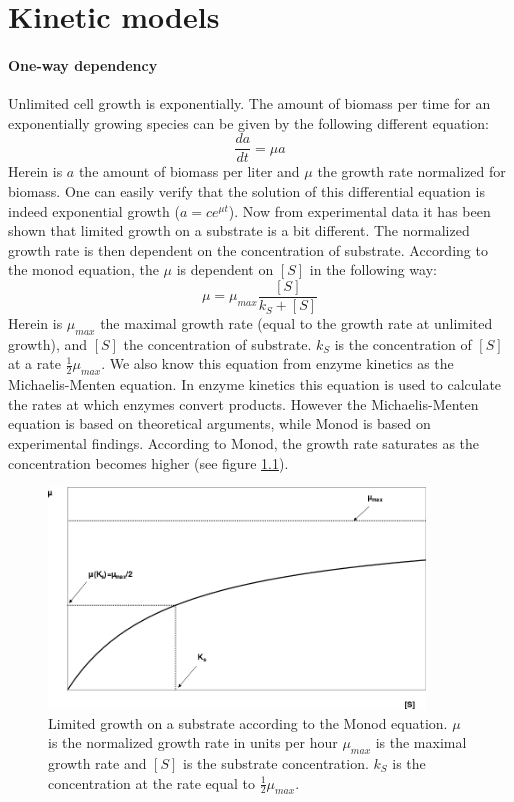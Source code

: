 \documentclass[12pt]{report}
\begin{document}
\chapter{Kinetic models}

\subsubsection{One-way dependency} \label{sec:un}
Unlimited cell growth is exponentially. The amount of biomass per time for an exponentially growing species can be given by the following different equation:
\begin{equation}
 \frac{da}{dt} = \mu a
\end{equation}
Herein is $a$ the amount of biomass per liter and $\mu$ the growth rate normalized for biomass. One can easily verify that the solution of this differential equation is indeed exponential growth ($a = ce^{\mu t}$). Now from experimental data it has been shown that limited growth on a substrate is a bit different. The normalized growth rate is then dependent on the concentration of substrate. According to the monod equation, the $\mu$ is dependent on $[S]$ in the following way:
\begin{equation}
 \mu = \mu_{max} \frac{[S]}{k_{S}+[S]}
\end{equation}
Herein is $\mu_{max}$ the maximal growth rate (equal to the growth rate at unlimited growth), and $[S]$ the concentration of substrate. $k_S$ is the concentration of $[S]$ at a rate $\frac{1}{2}\mu_{max}$. We also know this equation from enzyme kinetics as the Michaelis-Menten equation. In enzyme kinetics this equation is used to calculate the rates at which enzymes convert products. However the Michaelis-Menten equation is based on theoretical arguments, while Monod is based on experimental findings.
According to Monod, the growth rate saturates as the concentration becomes higher (see figure \ref{fig:monod}).

\begin{figure}[!ht]
 \begin{center}  
     \includegraphics[width=10cm]{Monod_3.png}
     \caption{Limited growth on a substrate according to the Monod equation. $\mu$ is the normalized growth rate in units per hour $\mu_{max}$ is the maximal growth rate and $[S]$ is the substrate concentration. $k_S$ is the concentration at the rate equal to 
     $\frac{1}{2} \mu_{max}$.}
    \label{fig:monod}
    \end{center}
\end{figure}
\end{document}
